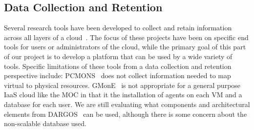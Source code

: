 \subsection{Data Collection and Retention}



Several research tools have been developed to collect and retain information across all layers of  a cloud~\cite{chaves2011toward,montes2013gmone,povedano2013dargos,alcaraz2015monpaas}.  
The focus of these projects have been on specific end tools for users or administrators of the cloud, while the primary goal of this part of our project is to develop a platform that can be used by a wide variety of tools.   Specific limitations of these tools from a data collection and retention perspective include:  PCMONS~\cite{chaves2011toward}  does not collect information needed to map virtual to physical resources. GMonE~\cite{montes2013gmone} is not appropriate for a general purpose IaaS cloud like the MOC in that it  the installation of agents on each VM and a database for each user.  We are still evaluating what components and architectural elements from DARGOS~\cite{povedano2013dargos} can be used, although there is some concern about the non-scalable database used. 

